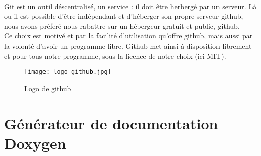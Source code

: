         \paragraph{}
            Git est un outil déscentralisé, un service : il doit être herbergé par un serveur. Là ou il est possible d'être indépendant et d'héberger son propre serveur github, nous avons préferé nous rabattre sur un hébergeur gratuit et public, github.
            \\ Ce choix est motivé et par la facilité d'utilisation qu'offre github, mais aussi par la volonté d'avoir un programme libre. Github met ainsi à 
            disposition librement et pour tous notre programme, sous la licence de notre choix (ici MIT).
            
            \begin{figure}[h]
                \begin{center}
                    \texttt{[image: logo\_github.jpg]}
                \end{center}

                \caption{Logo de github}
                \label{github}
            \end{figure}

    \newpage


    \section{Générateur de documentation Doxygen}
        \lipsum[1-2]